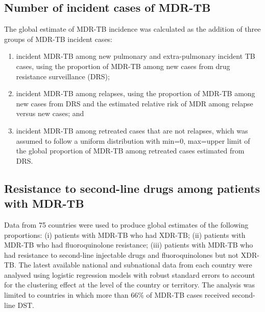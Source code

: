 \subsection{Number of incident cases of MDR-TB}

The global estimate of MDR-TB incidence was calculated as the addition of three groups of MDR-TB incident cases:
\begin{enumerate}
\item incident MDR-TB among new pulmonary and extra-pulmonary incident TB cases, using the proportion of MDR-TB among new cases from drug resistance surveillance (DRS); 
\item incident MDR-TB among relapses, using the proportion of MDR-TB among new cases from DRS and the estimated relative risk of MDR among relapse versus new cases; and
\item incident MDR-TB among retreated cases that are not relapses, which was assumed to follow a uniform distribution with min=0, max=upper limit of the global proportion of MDR-TB among retreated cases estimated from DRS. 
\end{enumerate}


\subsection{Resistance to second-line drugs among patients with MDR-TB}

Data from 75 countries were used to produce global estimates of the following proportions: (i) patients with MDR-TB who had XDR-TB; (ii) patients with MDR-TB who had fluoroquinolone resistance; (iii) patients with MDR-TB who had resistance to second-line injectable drugs and fluoroquinolones but not XDR-TB. The latest available national and subnational data from each country were analysed using logistic regression models with robust standard errors to account for the clustering effect at the level of the country or territory. The analysis was limited to countries in which more than 66\% of MDR-TB cases received second-line DST.




